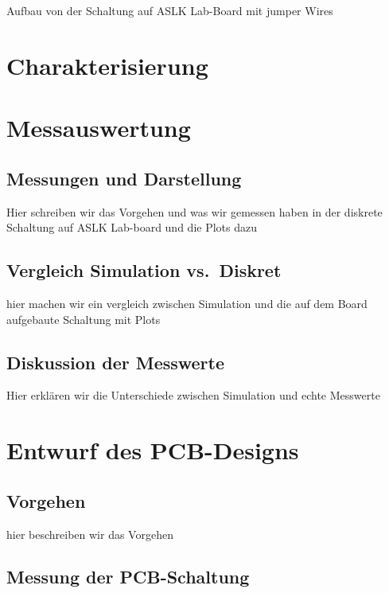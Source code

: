 \documentclass[
  ngerman,
  letterpaper,
  DIV=11]{scrreprt}
\begin{document}
Aufbau von der Schaltung auf ASLK Lab-Board mit jumper Wires

\chapter{Charakterisierung}\label{charakterisierung}

\chapter{Messauswertung}\label{messauswertung}

\section{Messungen und Darstellung}\label{messungen-und-darstellung}

Hier schreiben wir das Vorgehen und was wir gemessen haben in der
diskrete Schaltung auf ASLK Lab-board und die Plots dazu

\section{Vergleich Simulation
vs.~Diskret}\label{vergleich-simulation-vs.-diskret}

hier machen wir ein vergleich zwischen Simulation und die auf dem Board
aufgebaute Schaltung mit Plots

\section{Diskussion der Messwerte}\label{diskussion-der-messwerte}

Hier erklären wir die Unterschiede zwischen Simulation und echte
Messwerte

\chapter{Entwurf des PCB-Designs}\label{entwurf-des-pcb-designs}

\section{Vorgehen}\label{vorgehen}

hier beschreiben wir das Vorgehen

\section{Messung der PCB-Schaltung}\label{messung-der-pcb-schaltung}
\end{document}
